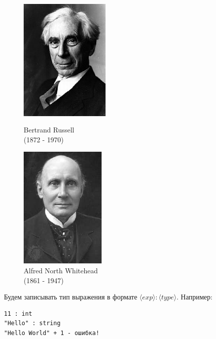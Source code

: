 \documentclass[a4paper,11pt]{article}
\begin{document}
\begin{figure}[h]
  \begin{minipage}[h]{0.49\linewidth}
    \begin{center}
        \includegraphics[height=60mm]{lecture1/russell.eps}
        \caption{Bertrand Russell\\(1872 - 1970)}
    \end{center}
  \end{minipage}
  \begin{minipage}[h]{0.49\linewidth}
    \begin{center}
      \includegraphics[height=60mm]{lecture1/whitehead.eps}
      \caption{Alfred North Whitehead\\(1861 - 1947)}
    \end{center}
  \end{minipage}
\end{figure}

Будем записывать тип выражения в формате $\langle exp \rangle : \langle type
\rangle$. Например:

\begin{lstlisting}
11 : int
"Hello" : string
"Hello World" + 1 - ошибка!
\end{lstlisting}
\end{document}
